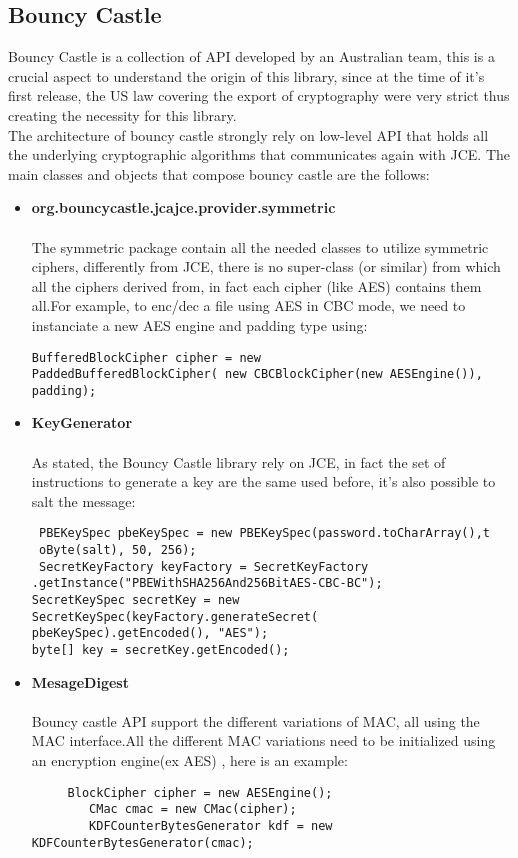 \documentclass{article}
\begin{document}
\subsection{Bouncy Castle}\label{sec:bcastle}
Bouncy Castle is a collection of API developed by an Australian team, this is a crucial aspect to understand the origin of this library, since at the time of it's first release, the US law covering the export of cryptography were very strict thus creating the necessity for this library.\\The architecture of bouncy castle strongly rely on low-level API that holds all the underlying cryptographic algorithms that communicates again with JCE.
The main classes and objects that compose bouncy castle are the follows:\\
\begin{itemize}
 
  \item \textbf{org.bouncycastle.jcajce.provider.symmetric}\\\\
  	The symmetric package contain all the needed classes to utilize symmetric ciphers, differently from JCE, there is no super-class (or similar) from which all the ciphers derived from, in fact each cipher (like AES) contains them all.For example, to enc/dec a file using AES in CBC mode, we need to instanciate a new AES engine and padding type using: 
\begin{verbatim}BufferedBlockCipher cipher = new 
PaddedBufferedBlockCipher( new CBCBlockCipher(new AESEngine()), padding);\end{verbatim}
    \item \textbf{KeyGenerator}\\\\
	As stated, the Bouncy Castle library rely on JCE, in fact the set of instructions to generate a key are the same used before, it's also possible to salt the message:	
\begin{verbatim}
 PBEKeySpec pbeKeySpec = new PBEKeySpec(password.toCharArray(),t
 oByte(salt), 50, 256);
 SecretKeyFactory keyFactory = SecretKeyFactory
.getInstance("PBEWithSHA256And256BitAES-CBC-BC");
SecretKeySpec secretKey = new SecretKeySpec(keyFactory.generateSecret(
pbeKeySpec).getEncoded(), "AES");
byte[] key = secretKey.getEncoded();
\end{verbatim}
	
	\item \textbf{MesageDigest}\\\\
	Bouncy castle API support the different variations of MAC, all using the MAC interface.All the different MAC variations need to be initialized using an encryption engine(ex AES) , here is an example:
	\begin{verbatim}
	 BlockCipher cipher = new AESEngine();
    	CMac cmac = new CMac(cipher);
    	KDFCounterBytesGenerator kdf = new KDFCounterBytesGenerator(cmac);
	\end{verbatim}
\end{itemize}
\end{document}
